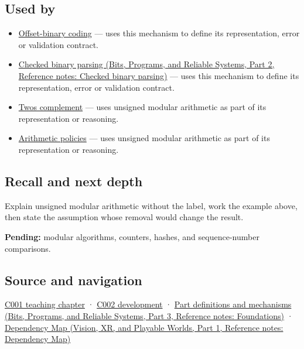 \subsection{Used by}\label{appendix-c99977d88b33-used-by}

\hypertarget{appendix-c99977d88b33-used-by}{}

\begin{itemize}
\item
  \hyperref[appendix-53a8cfb25f8d]{Offset-binary coding} --- uses this mechanism to define its representation, error or validation contract.
\item
  \href{../01-Bits-Programs-and-Reliable-Systems-P02/main.pdf\#nameddest=appendix-652d81568de9}{Checked binary parsing (Bits, Programs, and Reliable Systems, Part 2, Reference notes: Checked binary parsing)} --- uses this mechanism to define its representation, error or validation contract.
\item
  \hyperref[appendix-4fbc03d20829]{Two\textquotesingle s complement} --- uses unsigned modular arithmetic as part of its representation or reasoning.
\item
  \hyperref[appendix-2ed044358b82]{Arithmetic policies} --- uses unsigned modular arithmetic as part of its representation or reasoning.
\end{itemize}

\subsection{Recall and next depth}\label{appendix-c99977d88b33-recall-and-next-depth}

\hypertarget{appendix-c99977d88b33-recall-and-next-depth}{}

Explain unsigned modular arithmetic without the label, work the example above, then state the assumption whose removal would change the result.

\textbf{Pending:} modular algorithms, counters, hashes, and sequence-number comparisons.

\subsection{Source and navigation}\label{appendix-c99977d88b33-source-and-navigation}

\hypertarget{appendix-c99977d88b33-source-and-navigation}{}

\hyperref[01-foundations-i-ch001-from-a-signal-to-an-interpretation]{C001 teaching chapter} · \hyperref[01-foundations-i-ch001-arithmetic-becomes-a-policy]{C002 development} · \href{../01-Bits-Programs-and-Reliable-Systems-P03/main.pdf\#nameddest=appendix-fd090d982a15}{Part definitions and mechanisms (Bits, Programs, and Reliable Systems, Part 3, Reference notes: Foundations)} · \href{../07-Vision-XR-and-Playable-Worlds-P01/main.pdf\#nameddest=appendix-4ad47bdd269a}{Dependency Map (Vision, XR, and Playable Worlds, Part 1, Reference notes: Dependency Map)}
